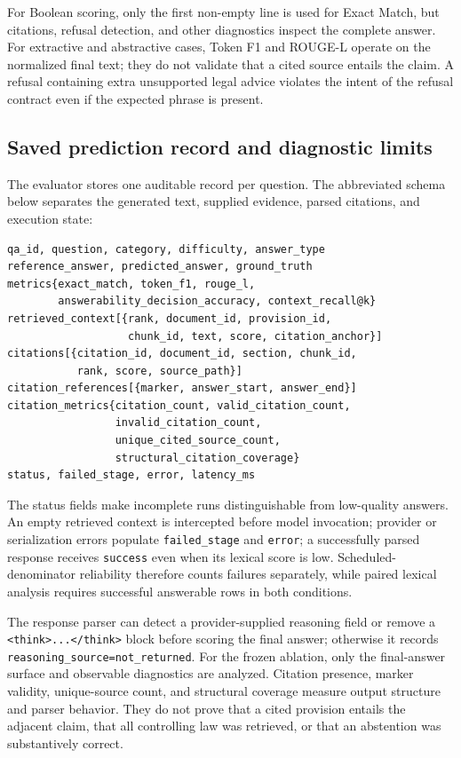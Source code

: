 For Boolean scoring, only the first non-empty line is used for Exact Match,
but citations, refusal detection, and other diagnostics inspect the complete
answer. For extractive and abstractive cases, Token F1 and ROUGE-L operate on
the normalized final text; they do not validate that a cited source entails
the claim. A refusal containing extra unsupported legal advice violates the
intent of the refusal contract even if the expected phrase is present.

\subsection{Saved prediction record and diagnostic limits}

The evaluator stores one auditable record per question. The abbreviated schema
below separates the generated text, supplied evidence, parsed citations, and
execution state:

{\scriptsize
\begin{verbatim}
qa_id, question, category, difficulty, answer_type
reference_answer, predicted_answer, ground_truth
metrics{exact_match, token_f1, rouge_l,
        answerability_decision_accuracy, context_recall@k}
retrieved_context[{rank, document_id, provision_id,
                   chunk_id, text, score, citation_anchor}]
citations[{citation_id, document_id, section, chunk_id,
           rank, score, source_path}]
citation_references[{marker, answer_start, answer_end}]
citation_metrics{citation_count, valid_citation_count,
                 invalid_citation_count,
                 unique_cited_source_count,
                 structural_citation_coverage}
status, failed_stage, error, latency_ms
\end{verbatim}
}

The status fields make incomplete runs distinguishable from low-quality
answers. An empty retrieved context is intercepted before model invocation;
provider or serialization errors populate \texttt{failed\_stage} and
\texttt{error}; a successfully parsed response receives \texttt{success} even
when its lexical score is low. Scheduled-denominator reliability therefore
counts failures separately, while paired lexical analysis requires successful
answerable rows in both conditions.

The response parser can detect a provider-supplied reasoning field or remove a
\texttt{<think>...</think>} block before scoring the final answer; otherwise it
records \texttt{reasoning\_source=not\_returned}. For the frozen ablation, only
the final-answer surface and observable diagnostics are analyzed. Citation
presence, marker validity, unique-source count, and structural coverage measure
output structure and parser behavior. They do not prove that a cited provision
entails the adjacent claim, that all controlling law was retrieved, or that an
abstention was substantively correct.

